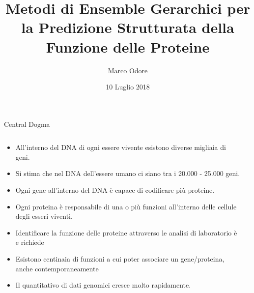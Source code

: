 \documentclass[9pt]{beamer}
\author{Marco Odore}
\title[Metodi di Ensemble Gerarchici]{Metodi di Ensemble Gerarchici per la Predizione Strutturata della Funzione delle Proteine}
\date{10 Luglio 2018}
\begin{document}
\titlepageframe
\begin{tframe}{Central Dogma}
  \begin{columns}
    \begin{column}{.65\textwidth}
      \minipage[c][0.4\textheight][s]{\columnwidth}
	   \begin{itemize}	
	  \item All'interno del DNA di ogni essere vivente esistono diverse migliaia di geni.   
	  \item Si stima che nel DNA dell'essere umano ci siano tra i 20.000 - 25.000 geni.
      \item Ogni gene all'interno del DNA è capace di codificare più proteine.	
      \item Ogni proteina è responsabile di una o più funzioni all'interno delle cellule degli esseri viventi.
	  \item Identificare la funzione delle proteine attraverso le analisi di laboratorio è  e richiede 
	  \onslide<6->
	  \item Esistono centinaia di funzioni a cui poter associare un gene/proteina, anche contemporaneamente 
	  \item Il quantitativo di dati genomici cresce molto rapidamente.
      \end{itemize}
      \endminipage      
    \end{column}
    \begin{column}{.35\textwidth}



    \end{column}
  \end{columns}

\end{tframe}
\end{document}
